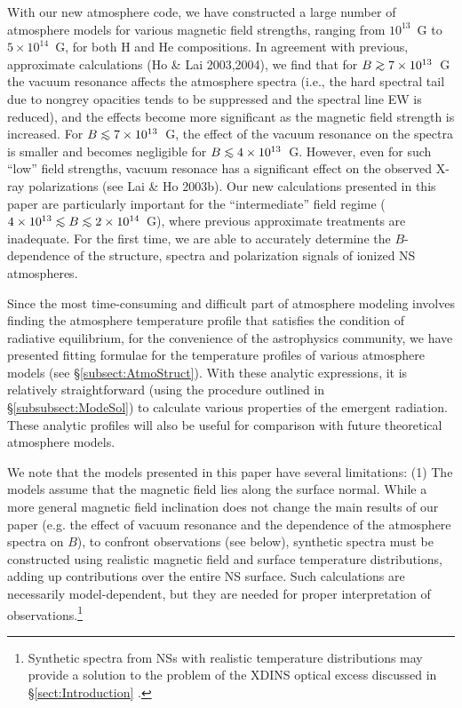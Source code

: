 \documentclass[useAMS,onecolumn,usenatbib,usegraphicx]{mn2e}
\def\go{\mathrel{\raise.3ex\hbox{$>$}\mkern-14mu\lower0.6ex\hbox{$\sim$}}}
\def\lo{\mathrel{\raise.3ex\hbox{$<$}\mkern-14mu\lower0.6ex\hbox{$\sim$}}}
\begin{document}
With our new atmosphere code, we have constructed a large number of
atmosphere models for various magnetic field strengths, ranging from
$10^{13}$~G to $5\times 10^{14}$~G, for both H and He compositions.
In agreement with previous, approximate calculations (Ho \& Lai
2003,2004), we find that for $B\go 7\times 10^{13}$~G the vacuum
resonance affects the atmosphere spectra (i.e., the hard spectral tail
due to nongrey opacities tends to be suppressed and the spectral line
%
%
EW is reduced), and the effects become more significant as the magnetic 
field strength is increased. 
For $B\lo 7\times 10^{13}$~G, the effect of the vacuum resonance 
on the spectra is smaller and becomes negligible for 
$B\lo 4\times 10^{13}$~G. However, even for such ``low''
field strengths, vacuum resonace has a significant effect on the observed
X-ray polarizations (see Lai \& Ho 2003b). 
Our new calculations presented in this paper 
are particularly important for the ``intermediate''
field regime ($4\times 10^{13}\lo B\lo 2\times 10^{14}$~G), where previous
approximate treatments are inadequate.
For the first time, we are able to accurately determine the $B$-dependence 
of the structure, spectra and polarization signals of ionized NS 
atmospheres.

Since the most time-consuming and difficult part of atmosphere modeling
involves finding the atmosphere temperature profile that satisfies 
the condition of radiative equilibrium, for the convenience of the
astrophysics community, we have presented fitting formulae for the 
temperature profiles of various atmosphere models (see \S\ref{subsect:AtmoStruct}). 
With these analytic expressions, it is relatively
straightforward (using the procedure outlined in \S\ref{subsubsect:ModeSol}) to calculate
various properties of the emergent radiation. These analytic profiles
will also be useful for comparison with future theoretical atmosphere 
models. 

We note that the models presented in this paper have several limitations: 
(1) The models assume that the magnetic field lies along the surface 
normal. While a more general magnetic field inclination 
does not change the main results of our paper (e.g. the effect 
of vacuum resonance and the dependence of the atmosphere spectra on 
$B$), to confront observations (see below), 
synthetic spectra must be constructed 
using realistic magnetic field and surface temperature distributions, 
adding up contributions over the entire NS surface.  
Such calculations are necessarily model-dependent, but they are needed for 
%
%
proper interpretation of observations.\footnote{Synthetic spectra 
from NSs with realistic temperature distributions may provide a solution 
to the problem of the XDINS optical excess discussed in \S\ref{sect:Introduction} 
\citep[see, e.g.,][]{Ponsetal02a,Burwitzetal03a}.}
\end{document}
